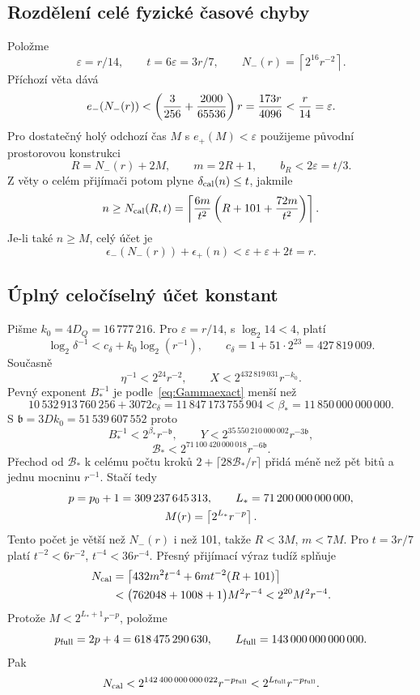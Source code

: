 \documentclass[11pt,a4paper]{article}
\theoremstyle{remark}\newtheorem{remark}[theorem]{Poznámka}
\numberwithin{equation}{section}
\begin{document}
\subsection{Rozdělení celé fyzické časové chyby}

Položme
\[
\varepsilon=r/14,\qquad t=6\varepsilon=3r/7,\qquad
N_-(r)=\left\lceil2^{16}r^{-2}\right\rceil.
\]
Příchozí věta dává
\[
e_-(N_-(r))<\left({3\over256}+{2000\over65536}\right)r
={173r\over4096}<{r\over14}=\varepsilon.
\]
Pro dostatečný holý odchozí čas \(M\) s \(e_+(M)<\varepsilon\) použijeme původní prostorovou konstrukci
\[
R=N_-(r)+2M,\qquad m=2R+1,
\qquad b_R<2\varepsilon=t/3.
\]
Z věty o celém přijímači potom plyne \(\delta_{\rm cal}(n)\le t\), jakmile
\[
n\ge N_{\rm cal}(R,t)
=\left\lceil{6m\over t^2}\left(R+101+{72m\over t^2}\right)\right\rceil.
\]
Je-li také \(n\ge M\), celý účet je
\begin{equation}
\epsilon_-(N_-(r))+\epsilon_+(n)
<\varepsilon+\varepsilon+2t=r.
\label{eq:general-ledger}
\end{equation}

\subsection{Úplný celočíselný účet konstant}

Pišme \(k_0=4D_Q=16\,777\,216\). Pro \(\varepsilon=r/14\), s \(\log_2 14<4\), platí
\[
\log_2\delta^{-1}<c_\delta+k_0\log_2(r^{-1}),
\qquad c_\delta=1+51\cdot2^{23}=427\,819\,009.
\]
Současně
\[
\eta^{-1}<2^{24}r^{-2},\qquad
X<2^{432\,819\,031}r^{-k_0}.
\]
Pevný exponent \(B_*^{-1}\) je podle~\eqref{eq:Gammaexact} menší než
\[
10\,532\,913\,760\,256+3072c_\delta
=11\,847\,173\,755\,904
<\beta_*=11\,850\,000\,000\,000.
\]
S \(\mathfrak b=3Dk_0=51\,539\,607\,552\) proto
\[
B_*^{-1}<2^{\beta_*}r^{-\mathfrak b},\qquad
Y<2^{35\,550\,210\,000\,002}r^{-3\mathfrak b},
\]
\[
\mathcal B_*<2^{71\,100\,420\,000\,018}r^{-6\mathfrak b}.
\]
Přechod od \(\mathcal B_*\) k celému počtu kroků
\(2+\lceil28\mathcal B_*/r\rceil\) přidá méně než pět bitů a jednu mocninu \(r^{-1}\). Stačí tedy
\begin{gather}
p=p_0+1=309\,237\,645\,313,\qquad
L_*=71\,200\,000\,000\,000,\notag\\
M(r)=\left\lceil2^{L_*}r^{-p}\right\rceil.
\label{eq:Mofr}
\end{gather}
Tento počet je větší než \(N_-(r)\) i než 101, takže \(R<3M\), \(m<7M\). Pro \(t=3r/7\) platí \(t^{-2}<6r^{-2}\), \(t^{-4}<36r^{-4}\). Přesný přijímací výraz tudíž splňuje
\begin{align*}
N_{\rm cal}
&=\left\lceil432m^2t^{-4}+6mt^{-2}(R+101)\right\rceil\\
&<\bigl(762048+1008+1\bigr)M^2r^{-4}
<2^{20}M^2r^{-4}.
\end{align*}
Protože \(M<2^{L_*+1}r^{-p}\), položme
\begin{equation}
p_{\rm full}=2p+4=618\,475\,290\,630,
\qquad L_{\rm full}=143\,000\,000\,000\,000.
\label{eq:fullpower}
\end{equation}
Pak
\[
N_{\rm cal}<2^{142\,400\,000\,000\,022}r^{-p_{\rm full}}
<2^{L_{\rm full}}r^{-p_{\rm full}}.
\]
\end{document}
